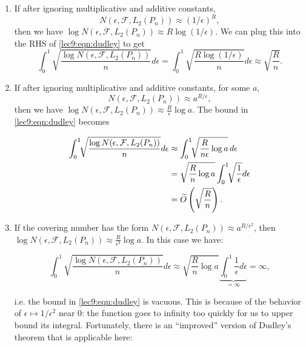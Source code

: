 \begin{enumerate}
\item If after ignoring multiplicative and additive constants,
\begin{equation}
    N(\epsilon, \mathcal{F}, L_2(P_n))\approx (1 / \epsilon)^R,
\end{equation}
then we have $\log N(\epsilon, \mathcal{F}, L_2(P_n)) \approx  R\log (1/\epsilon)$. We can plug this into the RHS of \eqref{lec9:eqn:dudley} to get
\begin{equation}
\int_{0}^{1}\sqrt{\frac{\log N(\epsilon, \mathcal{F}, L_2(P_n))}{n}}d\epsilon = \int_{0}^1\sqrt{\frac{R\log(1/\epsilon)}{n}}d\epsilon \approx \sqrt{\frac{R}{n}}.
\end{equation}
            
\item If after ignoring multiplicative and additive constants, for some $a$,
\begin{equation}
    N(\epsilon, \mathcal{F}, L_2(P_n))\approx a^{R/\epsilon},
\end{equation}
then we have $\log N(\epsilon, \mathcal{F}, L_2(P_n)) \approx \frac{R}{\epsilon}\log a$. The bound in \eqref{lec9:eqn:dudley} becomes
        
\begin{align}
\int_0^1\!\!\sqrt{\frac{\log N(\epsilon, \mathcal{F}, L_2(P_n))}{n}}d\epsilon &\approx \int_0^1\!\!\sqrt{\frac{R}{n\epsilon}\log a}\, d\epsilon \\
&= \sqrt{\frac{R}{n}\log a} \int_0^1\!\!\sqrt{\frac{1}{\epsilon}}d\epsilon \\
&= \widetilde{O} \left(\sqrt{\frac{R}{n}}\right).
\end{align}
        
\item If the covering number has the form $N(\epsilon, \mathcal{F}, L_2(P_n))\approx a^{R/\epsilon^2}$, then $\log N(\epsilon, \mathcal{F}, L_2(P_n))\approx \frac{R}{\epsilon^2}\log a$. In this case we have:
        
\begin{equation}\int_0^1\sqrt{\frac{\log N(\epsilon, \mathcal{F}, L_2(P_n))}{n}}d\epsilon \approx \sqrt{\frac{R}{n}\log a} \underbrace{\int_0^1\frac{1}{\epsilon}d\epsilon}_{=\infty}=\infty,
\end{equation}

i.e. the bound in \eqref{lec9:eqn:dudley} is vacuous. This is because of the behavior of $\epsilon \mapsto 1/\epsilon^2$ near 0: the function goes to infinity too quickly for us to upper bound its integral. Fortunately, there is an ``improved'' version of Dudley's theorem that is applicable here:
        

\end{enumerate}
